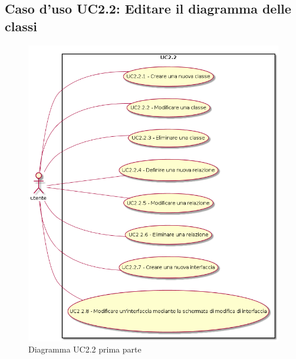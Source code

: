 \documentclass[../AnalisiDeiRequisiti.tex]{subfiles}
\begin{document}
	\subsection{Caso d'uso UC2.2: Editare il diagramma delle classi}
	\begin{figure} [H]
		\centering
		\includegraphics[scale=0.45]{./Figures/UC2-2parte1.png}
		\caption{Diagramma UC2.2 prima parte}\label{}
	\end{figure}
\end{document}
